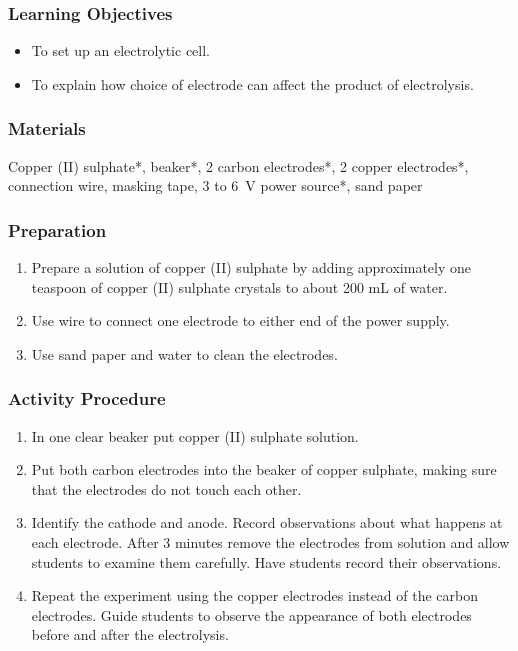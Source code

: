 \subsubsection*{Learning Objectives}
\begin{itemize}
\item{To set up an electrolytic cell.}
\item{To explain how choice of electrode can affect the product of electrolysis.}
\end{itemize}

\subsubsection*{Materials}
Copper (II) sulphate*, beaker*, 2 carbon electrodes*, 2 copper electrodes*, connection wire, masking tape, 3 to 6~V power source*, sand paper

\subsubsection*{Preparation}
\begin{enumerate}
\item{Prepare a solution of copper (II) sulphate by adding approximately one teaspoon of copper (II) sulphate crystals to about 200 mL of water.}
\item{Use wire to connect one electrode to either end of the power supply.}
\item{Use sand paper and water to clean the electrodes.}
\end{enumerate}

\subsubsection*{Activity Procedure}
\begin{enumerate}
\item{In one clear beaker put copper (II) sulphate solution.}
\item{Put both carbon electrodes into the beaker of copper sulphate, making sure that the electrodes do not touch each other.}
\item{Identify the cathode and anode. Record observations about what happens at each electrode. After 3 minutes remove the electrodes from solution and allow students to examine them carefully. Have students record their observations.}
\item{Repeat the experiment using the copper electrodes instead of the carbon electrodes. Guide students to observe the appearance of both electrodes before and after the electrolysis.}
\end{enumerate}

